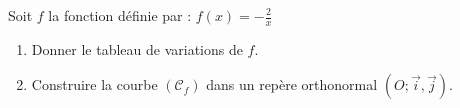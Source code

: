 \begin{Application}
Soit $f$ la fonction définie par : $f(x) = -\frac{2}{x}$

\begin{enumerate}
    \item Donner le tableau de variations de $f$.
    \item Construire la courbe $(\mathcal{C}_f)$ dans un repère orthonormal $(O; \vec{i}, \vec{j})$.
\end{enumerate}
\end{Application}